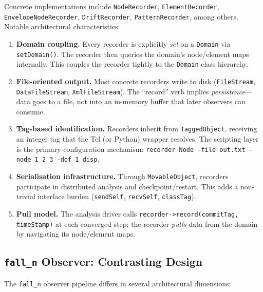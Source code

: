 Concrete implementations include \texttt{NodeRecorder},
\texttt{ElementRecorder}, \texttt{EnvelopeNodeRecorder},
\texttt{DriftRecorder}, \texttt{PatternRecorder}, among others.
Notable architectural characteristics:

\begin{enumerate}
  \item \textbf{Domain coupling.}  Every recorder is explicitly
        \emph{set} on a \texttt{Domain} via \texttt{setDomain()}.
        The recorder then queries the domain's node/element maps
        internally.  This couples the recorder tightly to the
        \texttt{Domain} class hierarchy.

  \item \textbf{File-oriented output.}  Most concrete recorders
        write to disk (\texttt{FileStream}, \texttt{DataFileStream},
        \texttt{XmlFileStream}).  The ``record'' verb implies
        \emph{persistence}---data goes to a file, not into an
        in-memory buffer that later observers can consume.

  \item \textbf{Tag-based identification.}  Recorders inherit from
        \texttt{TaggedObject}, receiving an integer tag that the Tcl
        (or Python) wrapper resolves.  The scripting layer is the
        primary configuration mechanism:
        \texttt{recorder Node -file out.txt -node 1 2 3 -dof 1 disp}.

  \item \textbf{Serialisation infrastructure.}  Through
        \texttt{MovableObject}, recorders participate in distributed
        analysis and checkpoint/restart.  This adds a non-trivial
        interface burden (\texttt{sendSelf}, \texttt{recvSelf},
        \texttt{classTag}).

  \item \textbf{Pull model.}  The analysis driver calls
        \texttt{recorder->record(commitTag, timeStamp)} at each
        converged step; the recorder \emph{pulls} data from the
        domain by navigating its node/element maps.
\end{enumerate}

\subsection{\texttt{fall\_n} Observer: Contrasting Design}
\label{sec:falln-observer-contrast}

The \texttt{fall\_n} observer pipeline differs in several
architectural dimensions:

